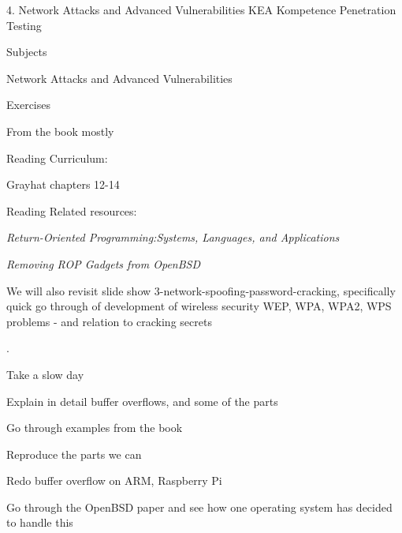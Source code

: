 \documentclass[Screen16to9,17pt]{foils}
\begin{document}
\mytitlepage
{4. Network Attacks and Advanced Vulnerabilities}
{KEA Kompetence Penetration Testing}





\begin{list1}
\item Subjects
\begin{list2}
\item Network Attacks and Advanced Vulnerabilities

\end{list2}
\item Exercises
\begin{list2}
\item From the book mostly
\end{list2}
\item  Reading Curriculum:
\begin{list2}
\item Grayhat chapters 12-14
\end{list2}
\item  Reading Related resources:
\begin{list2}
\item \emph{Return-Oriented Programming:Systems, Languages, and Applications}
\item \emph{Removing ROP Gadgets from OpenBSD}
\end{list2}
\item We will also revisit slide show 3-network-spoofing-password-cracking, specifically quick go through of development of wireless security WEP, WPA, WPA2, WPS problems - and relation to cracking secrets
\end{list1}



.

\begin{list1}
\item Take a slow day
\item Explain in detail buffer overflows, and some of the parts
\item Go through examples from the book
\item Reproduce the parts we can
\item Redo buffer overflow on ARM, Raspberry Pi
\item Go through the OpenBSD paper and see how one operating system has decided to handle this
\end{list1}
\end{document}

